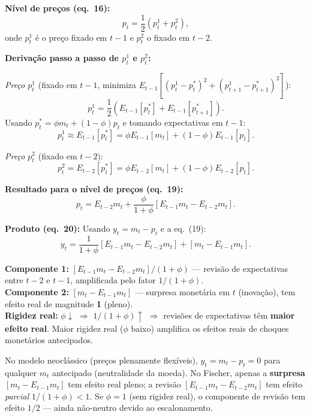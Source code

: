 \documentclass[12pt, a4paper]{article}
\begin{document}
\textbf{Nível de preços (eq.\ 16):}
\begin{equation}
p_t = \frac{1}{2}(p_t^1 + p_t^2), \tag{eq.\ 16}
\end{equation}
onde $p_t^1$ é o preço fixado em $t-1$ e $p_t^2$ o fixado em $t-2$.

\textbf{Derivação passo a passo de $p_t^1$ e $p_t^2$:}

\textit{Preço $p_t^1$} (fixado em $t-1$, minimiza $E_{t-1}[(p_t^1 - p_t^*)^2 + (p_{t+1}^1 - p_{t+1}^*)^2]$):
\[
p_t^1 = \frac{1}{2}(E_{t-1}[p_t^*] + E_{t-1}[p_{t+1}^*]).
\]
Usando $p_t^* = \phi m_t + (1-\phi)p_t$ e tomando expectativas em $t-1$:
\[
p_t^1 \approx E_{t-1}[p_t^*] = \phi E_{t-1}[m_t] + (1-\phi)E_{t-1}[p_t].
\]

\textit{Preço $p_t^2$} (fixado em $t-2$):
\[
p_t^2 = E_{t-2}[p_t^*] = \phi E_{t-2}[m_t] + (1-\phi)E_{t-2}[p_t].
\]

\textbf{Resultado para o nível de preços (eq.\ 19):}
\begin{equation}
p_t = E_{t-2}m_t + \frac{\phi}{1+\phi}\left[E_{t-1}m_t - E_{t-2}m_t\right]. \tag{eq.\ 19}
\end{equation}

\textbf{Produto (eq.\ 20):} Usando $y_t = m_t - p_t$ e a eq.\ (19):
\begin{equation}
\boxed{y_t = \frac{1}{1+\phi}\left[E_{t-1}m_t - E_{t-2}m_t\right] + \left[m_t - E_{t-1}m_t\right].} \tag{eq.\ 20}
\end{equation}

\begin{resultbox}[title={Interpretação do Modelo de Fischer (eqs.\ 19--20)}]
\textbf{Componente 1:} $[E_{t-1}m_t - E_{t-2}m_t]/(1+\phi)$ --- revisão de expectativas entre $t-2$ e $t-1$, amplificada pelo fator $1/(1+\phi)$.\\
\textbf{Componente 2:} $[m_t - E_{t-1}m_t]$ --- surpresa monetária em $t$ (inovação), tem efeito real de magnitude \textbf{1} (pleno).\\
\textbf{Rigidez real:} $\phi\downarrow$ $\Rightarrow$ $1/(1+\phi)\uparrow$ $\Rightarrow$ revisões de expectativas têm \textbf{maior efeito real}. Maior rigidez real ($\phi$ baixo) amplifica os efeitos reais de choques monetários antecipados.
\end{resultbox}

\begin{provabox}[title={Fischer vs.\ Neoclássico --- Para a Prova}]
No modelo neoclássico (preços plenamente flexíveis), $y_t = m_t - p_t = 0$ para qualquer $m_t$ antecipado (neutralidade da moeda). No Fischer, apenas a \textbf{surpresa} $[m_t - E_{t-1}m_t]$ tem efeito real pleno; a revisão $[E_{t-1}m_t - E_{t-2}m_t]$ tem efeito \emph{parcial} $1/(1+\phi) < 1$. Se $\phi=1$ (sem rigidez real), o componente de revisão tem efeito $1/2$ --- ainda não-neutro devido ao escalonamento.
\end{provabox}
\end{document}
